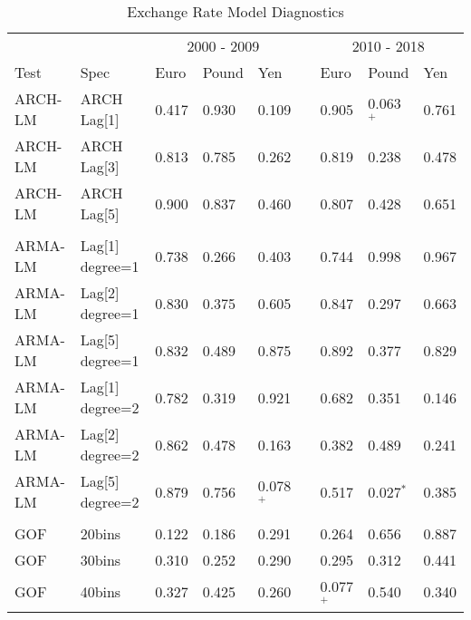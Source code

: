 \begin{table}
	\centering
	\fontsize{10pt}{10pt}\selectfont
	\begin{threeparttable}
		\caption{Exchange Rate Model Diagnostics}	\label{tbl:margin_model_diagnostic_pvalues}
		\begin{tabular}[c]{l l l l l c l l l}
			\midrule
					& & \multicolumn{3}{c}{2000 - 2009} & & \multicolumn{3}{c}{2010 - 2018} \\ \addlinespace[1mm]
			\cline{3-5} \cline{7-9}
		Test  & Spec                             & Euro  & Pound & Yen   & &  Euro & Pound & Yen   \\ \addlinespace[1mm]
			\midrule
	  ARCH-LM &        ARCH Lag[1] & 0.417 & 0.930       & 0.109       & & 0.905       & 0.063$^{+}$ & 0.761       \\
	  ARCH-LM &        ARCH Lag[3] & 0.813 & 0.785       & 0.262       & & 0.819       & 0.238       & 0.478       \\
	  ARCH-LM &        ARCH Lag[5] & 0.900 & 0.837       & 0.460       & & 0.807       & 0.428       & 0.651       \\ \\
	  ARMA-LM &    Lag[1] degree=1 & 0.738 & 0.266       & 0.403       & & 0.744       & 0.998       & 0.967       \\
	  ARMA-LM &    Lag[2] degree=1 & 0.830 & 0.375       & 0.605       & & 0.847       & 0.297       & 0.663       \\
	  ARMA-LM &    Lag[5] degree=1 & 0.832 & 0.489       & 0.875       & & 0.892       & 0.377       & 0.829       \\
	  ARMA-LM &    Lag[1] degree=2 & 0.782 & 0.319       & 0.921       & & 0.682       & 0.351       & 0.146       \\
	  ARMA-LM &    Lag[2] degree=2 & 0.862 & 0.478       & 0.163       & & 0.382       & 0.489       & 0.241       \\
	  ARMA-LM &    Lag[5] degree=2 & 0.879 & 0.756       & 0.078$^{+}$ & & 0.517       & 0.027$^{*}$ & 0.385       \\ \\
		  GOF &             20bins & 0.122 & 0.186       & 0.291       & & 0.264       & 0.656       & 0.887       \\
		  GOF &             30bins & 0.310 & 0.252       & 0.290       & & 0.295       & 0.312       & 0.441       \\
		  GOF &             40bins & 0.327 & 0.425       & 0.260       & & 0.077$^{+}$ & 0.540       & 0.340       \\

\end{tabular}
\end{threeparttable}
\end{table}
